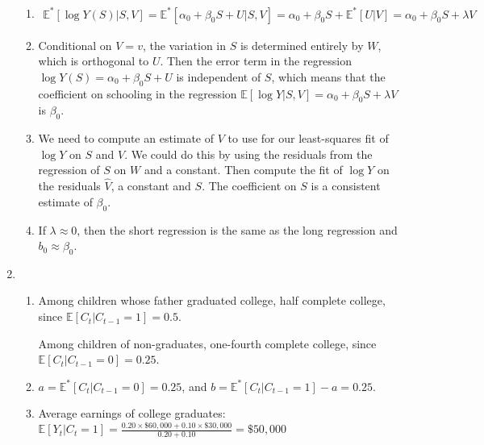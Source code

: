 \documentclass{article}
\begin{document}
\begin{enumerate}
\begin{enumerate}
		\item 

		\begin{align*}
		\mathbb{E}^*[\log Y(S) |S,V] = \mathbb{E}^*[\alpha_0 + \beta_0 S + U |S,V] = \alpha_0 + \beta_0 S +  \mathbb{E}^*[U|V] =  \alpha_0 + \beta_0 S +  \lambda V
		\end{align*}

		\item 

		Conditional on $V=v$, the variation in $S$ is determined entirely by $W$, which is orthogonal to $U$. Then the error term in the regression $\log Y(S) = \alpha_0 + \beta_0 S+ U$ is independent of $S$, which means that the coefficient on schooling in the regression $\mathbb{E} [\log Y|S,V] = \alpha_0 + \beta_0 S+ \lambda V$ is $\beta_0$.

		\item 

		We need to compute an estimate of $V$ to use for our least-squares fit of $\log Y$ on $S$ and $V$. We could do this by using the residuals from the regression of $S$ on $W$ and a constant. Then compute the fit of $\log Y$ on the residuals $\hat{V}$, a constant and $S$. The coefficient on $S$ is a consistent estimate of $\beta_0$.

		\item

		If $\lambda \approx 0$, then the short regression is the same as the long regression and $b_0 \approx \beta_0$.

	\end{enumerate}

	\item

	\begin{enumerate}

		\item

		Among children whose father graduated college, half complete college, since $\mathbb{E}[C_t | C_{t-1} = 1] = 0.5$.

		Among children of non-graduates, one-fourth complete college, since $\mathbb{E}[C_t | C_{t-1} = 0] = 0.25$.

		\item

		$a = \mathbb{E}^*[C_t|C_{t-1} = 0] = 0.25$, and $b = \mathbb{E}^*[C_t|C_{t-1} = 1] - a = 0.25$.

		\item 

		Average earnings of college graduates: $\mathbb{E}[Y_t | C_t = 1] = \frac{0.20 \times \$60,000 + 0.10 \times \$30,000}{0.20 + 0.10} = \$50,000$


\end{enumerate}
\end{enumerate}
\end{document}

